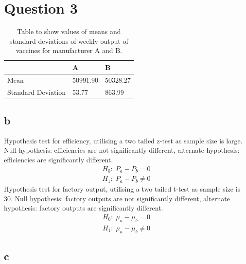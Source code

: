 \documentclass[11pt]{article}
\numberwithin{equation}{section}
\begin{document}
\section{Question 3}

\begin{table}[H]
    \centering
    \begin{tabular}{lll}
        \toprule
        & \textbf{A} & \textbf{B}\\
        \midrule
        Mean & 50991.90 & 50328.27\\
        Standard Deviation & 53.77 & 863.99\\
        \bottomrule
    \end{tabular}
    \caption{Table to show values of means and standard deviations of weekly output of vaccines for manufacturer A and B.}
\end{table}
\subsection{b}
Hypothesis test for efficiency, utilising a two tailed z-test as sample size is large. Null hypothesis: efficiencies are not significantly different, alternate hypothesis: efficiencies are significantly different.
\begin{align}
    H_0: \; P_a - P_b = 0\\
    H_1: \; P_a - P_b \neq 0
\end{align}
Hypothesis test for factory output, utilising a two tailed t-test as sample size is 30. Null hypothesis: factory outputs are not significantly different, alternate hypothesis: factory outputs are significantly different.
\begin{align}
    H_0: \; \mu_a - \mu_b = 0\\
    H_1: \; \mu_a - \mu_b \neq 0 
\end{align}
\subsection{c}
\end{document}
